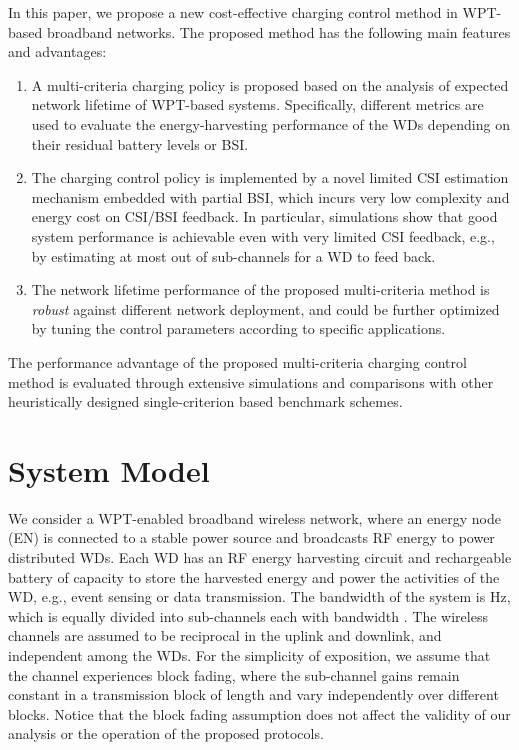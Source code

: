 \documentclass[conference]{IEEEtran}
\begin{document}
In this paper, we propose a new cost-effective charging control method in WPT-based broadband networks. The proposed method has the following main features and advantages:
\begin{enumerate}
  \item A multi-criteria charging policy is proposed based on the analysis of expected network lifetime of WPT-based systems. Specifically, different metrics are used to evaluate the energy-harvesting performance of the WDs depending on their residual battery levels or BSI.
  \item The charging control policy is implemented by a novel limited CSI estimation mechanism embedded with partial BSI, which incurs very low complexity and energy cost on CSI/BSI feedback. In particular, simulations show that good system performance is achievable even with very limited CSI feedback, e.g., by estimating at most  out of  sub-channels for a WD to feed back.
  \item The network lifetime performance of the proposed multi-criteria method is \emph{robust} against different network deployment, and could be further optimized by tuning the control parameters according to specific applications.
\end{enumerate}
The performance advantage of the proposed multi-criteria charging control method is evaluated through extensive simulations and comparisons with other heuristically designed single-criterion based benchmark schemes.

\section{System Model}
We consider a WPT-enabled broadband wireless network, where an energy node (EN) is connected to a stable power source and broadcasts RF energy to power  distributed WDs. Each WD has an RF energy harvesting circuit and rechargeable battery of capacity  to store the harvested energy and power the activities of the WD, e.g., event sensing or data transmission. The bandwidth of the system is  Hz, which is equally divided into  sub-channels each with bandwidth . The wireless channels are assumed to be reciprocal in the uplink and downlink, and independent among the WDs. For the simplicity of exposition, we assume that the channel experiences block fading, where the sub-channel gains remain constant in a transmission block of length  and vary independently over different blocks. Notice that the block fading assumption does not affect the validity of our analysis or the operation of the proposed protocols.
\end{document}
